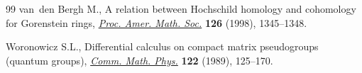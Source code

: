 \documentclass[10pt,a4paper]{amsart}
\numberwithin{equation}{section}
\begin{document}
\begin{thebibliography}{99}
van~den Bergh M., A relation between {H}ochschild homology and cohomology for
 {G}orenstein rings, \href{https://doi.org/10.1090/S0002-9939-98-04210-5}{\textit{Proc. Amer. Math. Soc.}} \textbf{126} (1998),
 1345--1348.

Woronowicz S.L., Differential calculus on compact matrix pseudogroups (quantum
 groups), \href{https://doi.org/10.1007/BF01221411}{\textit{Comm. Math. Phys.}} \textbf{122} (1989), 125--170.

\end{thebibliography}
\end{document}
